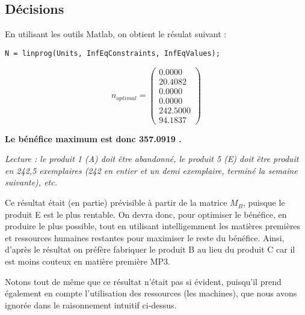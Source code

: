 \subsection{Décisions}

En utilisant les outils Matlab, on obtient le résulat suivant :
\begin{lstlisting}
N = linprog(Units, InfEqConstraints, InfEqValues);
\end{lstlisting}

\[
	n_{optimal} = 
\begin{pmatrix}
    0.0000 \\
   20.4082 \\
    0.0000 \\
    0.0000 \\
  242.5000 \\
   94.1837
\end{pmatrix}
\]

\begin{center}
\textbf{Le bénéfice maximum est donc 357.0919 \textcurrency.}
\par\noindent\textit{Lecture : le produit 1 (A) doit être abandonné, le produit 5 (E) doit être produit en 242,5 exemplaires (242 en entier et un demi exemplaire, terminé la semaine suivante), etc.}
\end{center}

Ce résultat était (en partie) prévisible à partir de la matrice $M_{B}$, puisque le produit E est le plus rentable. On devra donc, pour optimiser le bénéfice, en produire le plus possible, tout en utilisant intelligemment les matières premières et ressources humaines restantes pour maximiser le reste du bénéfice. Ainsi, d'après le résultat on préfère fabriquer le produit B au lieu du produit C car il est moins couteux en matière première MP3.

Notons tout de même que ce résultat n'était pas si évident, puisqu'il prend également en compte l'utilisation des ressources (les machines), que nous avons ignorée dans le raisonnement \og intuitif \fg ci-dessus.

